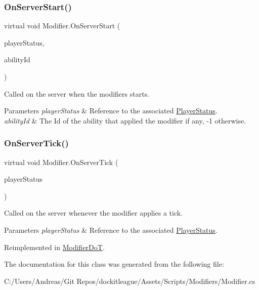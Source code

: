 \subsubsection{\texorpdfstring{On\+Server\+Start()}{OnServerStart()}}
{\footnotesize\ttfamily virtual void Modifier.\+On\+Server\+Start (\begin{DoxyParamCaption}\item[{\hyperlink{class_player_status}{Player\+Status}}]{player\+Status,  }\item[{int}]{ability\+Id }\end{DoxyParamCaption})\hspace{0.3cm}{\ttfamily [virtual]}}



Called on the server when the modifiers starts. 


\begin{DoxyParams}{Parameters}
{\em player\+Status} & Reference to the associated \hyperlink{class_player_status}{Player\+Status}.\\
\hline
{\em ability\+Id} & The Id of the ability that applied the modifier if any, -\/1 otherwise.\\
\hline
\end{DoxyParams}
\hypertarget{class_modifier_ac084768937c10fbcc456c37ec9f634fb}{}\label{class_modifier_ac084768937c10fbcc456c37ec9f634fb} 
\subsubsection{\texorpdfstring{On\+Server\+Tick()}{OnServerTick()}}
{\footnotesize\ttfamily virtual void Modifier.\+On\+Server\+Tick (\begin{DoxyParamCaption}\item[{\hyperlink{class_player_status}{Player\+Status}}]{player\+Status }\end{DoxyParamCaption})\hspace{0.3cm}{\ttfamily [virtual]}}



Called on the server whenever the modifier applies a tick. 


\begin{DoxyParams}{Parameters}
{\em player\+Status} & Reference to the associated \hyperlink{class_player_status}{Player\+Status}.\\
\hline
\end{DoxyParams}


Reimplemented in \hyperlink{class_modifier_do_t_ae743a2ff9e1a200e2b1308e38386adcf}{Modifier\+DoT}.



The documentation for this class was generated from the following file\+:\begin{DoxyCompactItemize}
\item 
C\+:/\+Users/\+Andreas/\+Git Repos/dockitleague/\+Assets/\+Scripts/\+Modifiers/Modifier.\+cs\end{DoxyCompactItemize}
